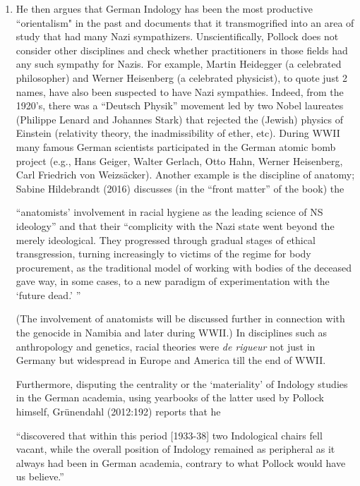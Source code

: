 {\begin{enumerate}
\item He then argues that German Indology has been the most productive “orientalism" in the past and documents that it transmogrified into an area of study that had many Nazi sympathizers. Unscientifically, Pollock does not consider other disciplines and check whether practitioners in those fields had any such sympathy for Nazis. For example, Martin Heidegger (a celebrated philosopher) and Werner Heisenberg (a celebrated physicist), to quote just 2 names, have also been suspected to have Nazi sympathies. Indeed, from the 1920’s, there was a “Deutsch Physik” movement led by two Nobel laureates (Philippe Lenard and Johannes Stark) that rejected the (Jewish) physics of Einstein (relativity theory, the inadmissibility of ether, etc). During WWII many famous German scientists participated in the German atomic bomb project (e.g., Hans Geiger, Walter Gerlach, Otto Hahn, Werner Heisenberg, Carl Friedrich von Weizsäcker). Another example is the discipline of anatomy; Sabine Hildebrandt (2016) discusses (in the “front matter” of the book) the 
\begin{myquote}
“anatomists’ involvement in racial hygiene as the leading science of NS ideology” and that their “complicity with the Nazi state went beyond the merely ideological. They progressed through gradual stages of ethical transgression, turning increasingly to victims of the regime for body procurement, as the traditional model of working with bodies of the deceased gave way, in some cases, to a new paradigm of experimentation with the ‘future dead.’ ”
\end{myquote}

(The involvement of anatomists will be discussed further in connection with the genocide in Namibia and later during WWII.) In disciplines such as anthropology and genetics, racial theories were {\sl de rigueur} not just in Germany but widespread in Europe and America till the end of WWII. 

Furthermore, disputing the centrality or the ‘materiality’ of Indology studies in the German academia, using yearbooks of the latter used by Pollock himself, Grünendahl (2012:192) reports that he

\begin{myquote}
“discovered that within this period [1933-38] two Indological chairs fell vacant, while the overall position of Indology remained as peripheral as it always had been in German academia, contrary to what Pollock would have us believe.”
\end{myquote}


\end{enumerate}}
